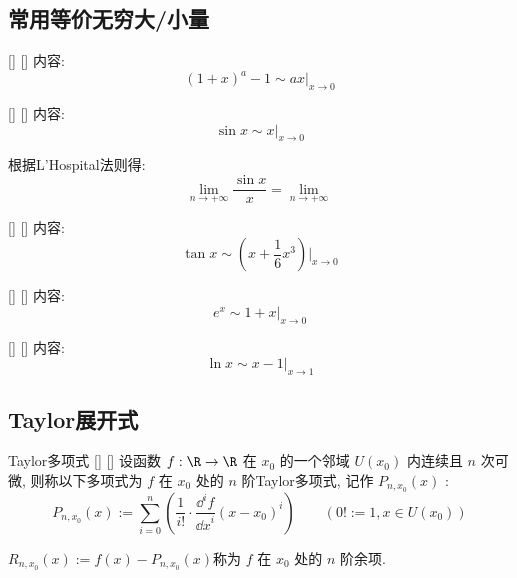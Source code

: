 \documentclass[UTF8]{ctexart}
\begin{document}
		\subsection{常用等价无穷大/小量}
		
			\begin{xmp}
			    []
			    {}
			    []
			    []
				内容: 
				\[(1+x)^a-1\sim ax|_{x\to 0}\]
			\end{xmp}

			\begin{xmp}
			    []
			    {}
			    []
			    []
				内容: 
				\[\sin x\sim x|_{x\to 0}\]
			\end{xmp}

			\begin{prf}
				
				根据L'Hospital法则得: 
				\[\lim_{n\to+\infty}\frac{\sin x}{x}=\lim_{n\to+\infty}\frac{}{}\]

			\end{prf}

			\begin{xmp}
			    []
			    {}
			    []
			    []
				内容: 
				\[\tan x\sim \left(x+\frac{1}{6}x^3\right)|_{x\to 0}\]
			\end{xmp}
			
			\begin{xmp}
			    []
			    {}
			    []
			    []
				内容: 
				\[e^x\sim 1+x|_{x\to 0}\]
			\end{xmp}
			
			\begin{xmp}
			    []
			    {}
			    []
			    []
				内容: 
				\[\ln x\sim x-1|_{x\to 1}\]
			\end{xmp}
				
		\subsection{Taylor展开式}
			
			\begin{dfn}
			    []
			    {Taylor多项式}
			    []
			    []
				设函数 \(f:\R\to\R\) 在 \(x_0\) 的一个邻域 \(U(x_0)\) 内连续且 \(n\) 次可微, 则称以下多项式为 \(f\) 在 \(x_0\) 处的 \(n\) 阶Taylor多项式, 记作 \(P_{n,x_0}(x)\) : 
				\[P_{n,x_0}(x):=\sum_{i=0}^n\left(\frac{1}{i!}\cdot\frac{\dd^i f}{{\dd x}^i}(x-x_0)^i\right)\qquad(0!:=1, x\in U(x_0))\]

				\(R_{n,x_0}(x):=f(x)-P_{n,x_0}(x)\)称为 \(f\) 在 \(x_0\) 处的 \(n\) 阶余项. 
			\end{dfn}
			
\end{document}

